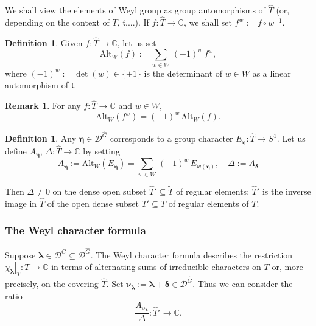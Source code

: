 \documentclass[12pt,a4paper]{article}
\theoremstyle{plain}
\theoremstyle{definition}
\newtheorem{defn}[thm]{Definition}%
\newtheorem{rem}[thm]{Remark}%
\begin{document}
We shall view the elements of 
Weyl group as 
group automorphisms of $\hat{T}$ (or, depending
on the context of $T$, $\mathfrak{t}$,...). 
If $f:\hat{T}\rightarrow \mathbb{C}$, we shall
set $f^w:=f\circ w^{-1}$.
\begin{defn}
\label{defn:alternator}
Given $f:\hat{T}\rightarrow \mathbb{C}$, 
let us set
$$
\mathrm{Alt}_W(f):=\sum_{w\in W}\,(-1)^w\,
f^w,
$$
where $(-1)^w:=\det(w)\in \{\pm 1\}$ 
is the determinant of $w\in W$ 
as a linear automorphism of $\mathfrak{t}$. 
\end{defn}

\begin{rem}
\label{rem:alternanza}
For any $f:\hat{T}\rightarrow \mathbb{C}$ and
$w\in W$, 
$$
\mathrm{Alt}_W(f^w)=(-1)^w\,\mathrm{Alt}_W(f).
$$
\end{rem}


\begin{defn}
Any $\boldsymbol{\eta}\in \mathcal{D}^{\hat{G}}$
corresponds to a group character
$E_{\boldsymbol{\eta}}:\hat{T}\rightarrow S^1$.
Let us define $A_{\boldsymbol{\eta}},\,\Delta:
\hat{T}\rightarrow \mathbb{C}$ by setting
$$
A_{\boldsymbol{\eta}}:=\mathrm{Alt}_W(E_{\boldsymbol{\eta}})
=\sum_{w\in W}\,(-1)^w\,E_{w(\boldsymbol{\eta})},
\quad \Delta:=A_{\boldsymbol{\delta}}
$$
\end{defn}

Then $\Delta\neq 0$ on the dense open subset
$\hat{T}'\subseteq \tilde{T}$ of regular elements; $\hat{T}'$
is the inverse image in $\hat{T}$ of the open dense subset
$T'\subseteq T$ of regular elements of $T$.

\subsubsection{The Weyl character formula}
\label{sctn:weyl char for}

Suppose 
$\boldsymbol{\lambda}\in \mathcal{D}^G\subseteq \mathcal{D}^{\hat{G}}$.
The Weyl character formula describes the restriction 
$\left.\chi_{\boldsymbol{\lambda}}\right|_T:T\rightarrow \mathbb{C}$ 
in terms of alternating sums
of irreducible characters on $T$ or, more precisely, on the
covering $\hat{T}$.
Set $\boldsymbol{\nu}_{\boldsymbol{\lambda}}:=
\boldsymbol{\lambda}+\boldsymbol{\delta}\in \mathcal{D}^{\hat{G}}$.
Thus we can consider the ratio
\begin{equation}
\label{eqn:ratio weyl char}
\frac{A_{\boldsymbol{\nu}_{\boldsymbol{\lambda}}}}{\Delta}:
\hat{T}'\rightarrow \mathbb{C}.
\end{equation}
\end{document}
